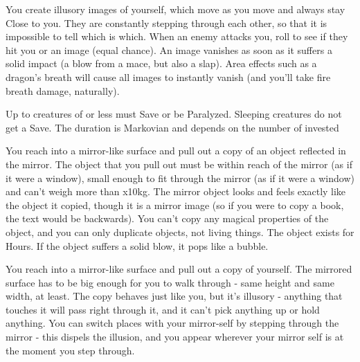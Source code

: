 {You create \DICE illusory images of yourself, which move as you move and always stay Close to you. They are constantly stepping through each other, so that it is impossible to tell which is which. When an enemy attacks you, roll to see if they hit you or an image (equal chance). An image vanishes as soon as it suffers a solid impact (a blow from a mace, but also a slap). Area effects such as a dragon's breath will cause all images to instantly vanish (and you'll take fire breath damage, naturally).

\MYSTERY [
  Name = Paralysis,
  Link = arcana-mystery-paralysis,
  Paradigm = Mind,
  Save = Y (neg.),
  Duration = Markovian,
  Target = Close or Nearby Target(s)
]

Up to \DICE creatures of \DICE \HD or less must Save or be Paralyzed.  Sleeping creatures do not get a Save. The duration is Markovian and depends on the number of \DICE invested

\MYSTERY [
  Name = Strange Copy,
  Link = arcana-mystery-strange-copy,
  Paradigm = Mind,
  Save = N,
  Duration = \SUM Hours,
  Target = Close Target(s)
]

You reach into a mirror-like surface and pull out a copy of an object reflected in the mirror. The object that you pull out must be within reach of the mirror (as if it were a window), small enough to fit through the mirror (as if it were a window) and can't weigh more than \DICE x10kg. The mirror object looks and feels exactly like the object it copied, though it is a mirror image (so if you were to copy a book, the text would be backwards).  You can't copy any magical properties of the object, and you can only duplicate objects, not living things.  The object exists for \SUMDICE Hours.  If the object suffers a solid blow, it pops like a bubble.

\MYSTERY [
  Name = Twin,
  Link = arcana-mystery-twin,
  Paradigm = Mind,
  Save = N,
  Duration = \SUM Minutes,
  Target = Close Target(s)
]

You reach into a mirror-like surface and pull out a copy of yourself.  The mirrored surface has to be big enough for you to walk through - same height and same width, at least.  The copy behaves just like you, but it's illusory - anything that touches it will pass right through it, and it can't pick anything up or hold anything.  You can switch places with your mirror-self by stepping through the mirror - this dispels the illusion, and you appear wherever your mirror self is at the moment you step through.

}

